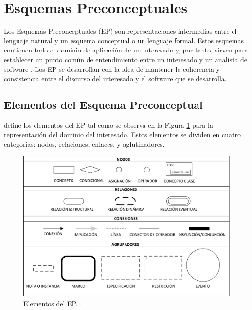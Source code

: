 \section{Esquemas Preconceptuales}\label{sec:EP}

Los Esquemas Preconceptuales (EP) son representaciones intermedias entre el lenguaje natural y un esquema conceptual o un lenguaje formal. Estos esquemas contienen todo el dominio de aplicación de un interesado y, por tanto, sirven para establecer un punto común de entendimiento entre un interesado y un analista de software \citep{zapata2007phd}. Los EP se desarrollan con la idea de mantener la coherencia y consistencia entre el discurso del interesado y el software que se desarrolla. 

\subsection{Elementos del Esquema Preconceptual}\label{subsec:ElementsEP}
\cite{zapata2012unc} define los elementos del EP tal como se observa en la Figura \ref{fig:InitialPS} para la representación del dominio del interesado. Estos elementos se dividen en cuatro categorías: nodos, relaciones, enlaces, y aglutinadores.\\

\begin{figure}[h]
	\centering%
	\includegraphics[scale=0.51]{Fig/ElementosDelEP.pdf}%
	\caption[Elementos del EP.]{Elementos del EP. \citep{zapata2012unc}.} \label{fig:InitialPS}
\end{figure}

